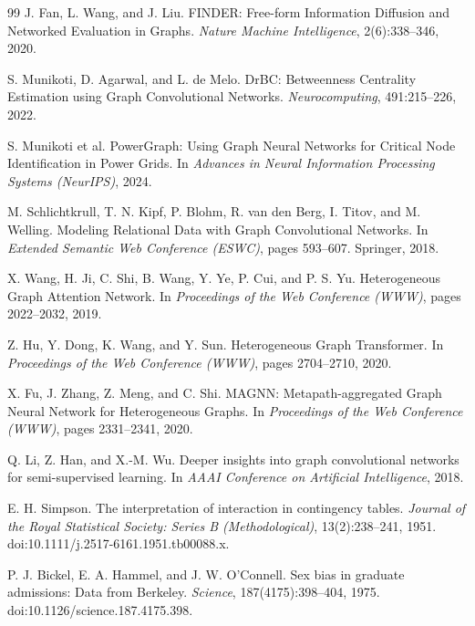 \documentclass[sigconf,9pt,anonymous]{acmart}
\begin{document}
\begin{thebibliography}{99}
J. Fan, L. Wang, and J. Liu. FINDER: Free-form Information Diffusion and Networked Evaluation in Graphs. \emph{Nature Machine Intelligence}, 2(6):338--346, 2020.

S. Munikoti, D. Agarwal, and L. de Melo. DrBC: Betweenness Centrality Estimation using Graph Convolutional Networks. \emph{Neurocomputing}, 491:215--226, 2022.

S. Munikoti et al. PowerGraph: Using Graph Neural Networks for Critical Node Identification in Power Grids. In \emph{Advances in Neural Information Processing Systems (NeurIPS)}, 2024.

M. Schlichtkrull, T. N. Kipf, P. Blohm, R. van den Berg, I. Titov, and M. Welling. Modeling Relational Data with Graph Convolutional Networks. In \emph{Extended Semantic Web Conference (ESWC)}, pages 593--607. Springer, 2018.

X. Wang, H. Ji, C. Shi, B. Wang, Y. Ye, P. Cui, and P. S. Yu. Heterogeneous Graph Attention Network. In \emph{Proceedings of the Web Conference (WWW)}, pages 2022--2032, 2019.

Z. Hu, Y. Dong, K. Wang, and Y. Sun. Heterogeneous Graph Transformer. In \emph{Proceedings of the Web Conference (WWW)}, pages 2704--2710, 2020.

X. Fu, J. Zhang, Z. Meng, and C. Shi. MAGNN: Metapath-aggregated Graph Neural Network for Heterogeneous Graphs. In \emph{Proceedings of the Web Conference (WWW)}, pages 2331--2341, 2020.

Q. Li, Z. Han, and X.-M. Wu. Deeper insights into graph convolutional networks for semi-supervised learning. In \emph{AAAI Conference on Artificial Intelligence}, 2018.

E. H. Simpson. The interpretation of interaction in contingency tables. \emph{Journal of the Royal Statistical Society: Series B (Methodological)}, 13(2):238--241, 1951. doi:10.1111/j.2517-6161.1951.tb00088.x.

P. J. Bickel, E. A. Hammel, and J. W. O'Connell. Sex bias in graduate admissions: Data from Berkeley. \emph{Science}, 187(4175):398--404, 1975. doi:10.1126/science.187.4175.398.
\end{thebibliography}
\end{document}
